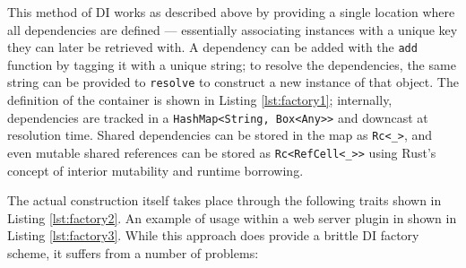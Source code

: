 \documentclass[sigconf]{acmart}
\begin{document}
This method of DI works as described above by providing a single location where all dependencies are defined --- essentially associating instances with a unique key they can later be retrieved with. A dependency can be added with the \lstinline{add} function by tagging it with a unique string; to resolve the dependencies, the same string can be provided to \lstinline{resolve} to construct a new instance of that object. The definition of the container is shown in Listing \ref{lst:factory1}; internally, dependencies are tracked in a \lstinline{HashMap<String, Box<Any>>} and downcast at resolution time. Shared dependencies can be stored in the map as \lstinline{Rc<_>}, and even mutable shared references can be stored as \lstinline{Rc<RefCell<_>>} using Rust's concept of interior mutability and runtime borrowing.

\begin{minipage}{\linewidth}

\end{minipage}


The actual construction itself takes place through the following traits shown in Listing \ref{lst:factory2}. An example of usage within a web server plugin in shown in Listing \ref{lst:factory3}. While this approach does provide a brittle DI factory scheme, it suffers from a number of problems:
\end{document}
